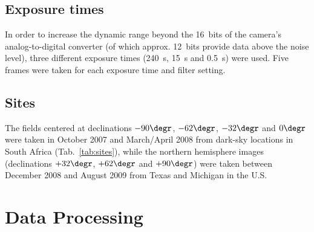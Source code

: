 \documentclass[preprint]{aastex}
\begin{document}
\subsection{Exposure times}
In order to increase the dynamic range beyond the 16~bits of the camera's analog-to-digital converter (of which approx. 12~bits provide data above the noise level), three different exposure times (240~s, 15~s and 0.5~s) were used. Five frames were taken for each exposure time and filter setting.

\subsection{Sites}
The fields centered at declinations $-90\degr$, $-62\degr$, $-32\degr$ and $0\degr$ were taken in October 2007 and March/April 2008 from dark-sky locations in South Africa (Tab.~\ref{tab:sites}), while the northern hemisphere images (declinations $+32\degr$, $+62\degr$ and $+90\degr$) were taken between December 2008 and August 2009 from Texas and Michigan in the U.S.



\section{Data Processing}
\end{document}
